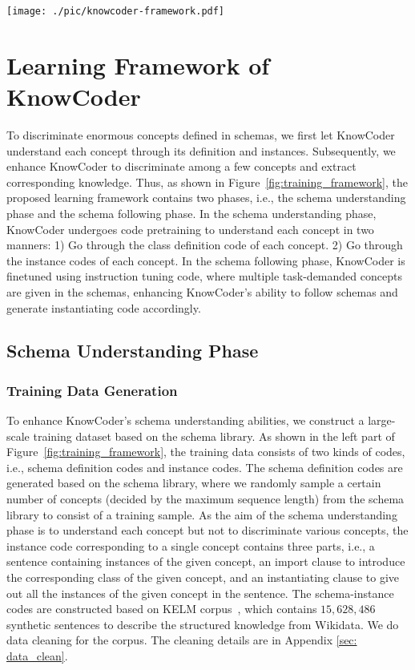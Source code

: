 \begin{figure*}[tbp]  
  \centering
  \texttt{[image: ./pic/knowcoder-framework.pdf]}
  \caption{An diagram of training and inference processes of KnowCoder.}
 \vspace{-4mm}
  \label{fig:training_framework}
  \end{figure*}

\section{Learning Framework of KnowCoder}

To discriminate enormous concepts defined in schemas, we first let KnowCoder understand each concept through its definition and instances. Subsequently, we enhance KnowCoder to discriminate among a few concepts and extract corresponding knowledge. Thus, as shown in Figure~\ref{fig:training_framework}, the proposed learning framework contains two phases, i.e., the schema understanding phase and the schema following phase. In the schema understanding phase, KnowCoder undergoes code pretraining to understand each concept in two manners: 1) Go through the class definition code of each concept. 2) Go through the instance codes of each concept. In the schema following phase, KnowCoder is finetuned using instruction tuning code, where multiple task-demanded concepts are given in the schemas, enhancing KnowCoder's ability to follow schemas and generate instantiating code accordingly.

\subsection{Schema Understanding Phase}

\subsubsection{Training Data Generation}
To enhance KnowCoder's schema understanding abilities, we construct a large-scale training dataset based on the schema library. As shown in the left part of Figure~\ref{fig:training_framework}, the training data consists of two kinds of codes, i.e., schema definition codes and instance codes. The schema definition codes are generated based on the schema library, where we randomly sample a certain number of concepts (decided by the maximum sequence length) from the schema library to consist of a training sample. As the aim of the schema understanding phase is to understand each concept but not to discriminate various concepts, the instance code corresponding to a single concept contains three parts, i.e., a sentence containing instances of the given concept, an import clause to introduce the corresponding class of the given concept, and an instantiating clause to give out all the instances of the given concept in the sentence. The schema-instance codes are constructed based on KELM corpus~\cite{agarwal-etal-2021-knowledge}, which contains $15, 628, 486$ synthetic sentences to describe the structured knowledge from Wikidata. We do data cleaning for the corpus. The cleaning details are in Appendix \ref{sec: data_clean}.

